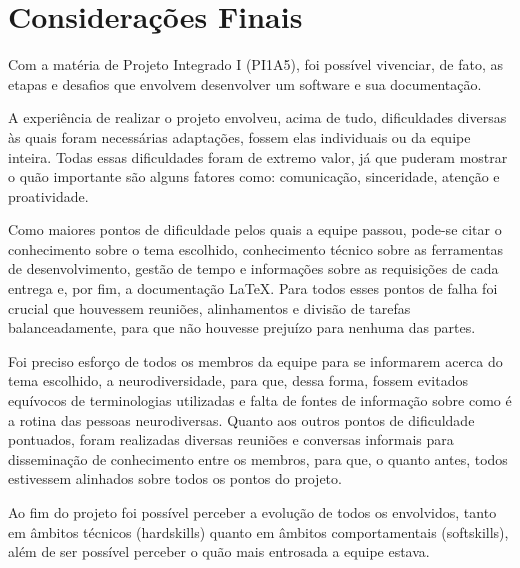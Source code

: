 \chapter{Considerações Finais}
Com a matéria de Projeto Integrado I (PI1A5), foi possível vivenciar, de fato, as etapas e desafios que envolvem desenvolver um software e sua documentação.

A experiência de realizar o projeto envolveu, acima de tudo, dificuldades diversas às quais foram necessárias adaptações, fossem elas individuais ou da equipe inteira. Todas essas dificuldades foram de extremo valor, já que puderam mostrar o quão importante são alguns fatores como: comunicação, sinceridade, atenção e proatividade.

Como maiores pontos de dificuldade pelos quais a equipe passou, pode-se citar o conhecimento sobre o tema escolhido, conhecimento técnico sobre as ferramentas de desenvolvimento, gestão de tempo e informações sobre as requisições de cada entrega e, por fim, a documentação LaTeX. Para todos esses pontos de falha foi crucial que houvessem reuniões, alinhamentos e divisão de tarefas balanceadamente, para que não houvesse prejuízo para nenhuma das partes.

Foi preciso esforço de todos os membros da equipe para se informarem acerca do tema escolhido, a neurodiversidade, para que, dessa forma, fossem evitados equívocos de terminologias utilizadas e falta de fontes de informação sobre como é a rotina das pessoas neurodiversas. Quanto aos outros pontos de dificuldade pontuados, foram realizadas diversas reuniões e conversas informais para disseminação de conhecimento entre os membros, para que, o quanto antes, todos estivessem alinhados sobre todos os pontos do projeto.

Ao fim do projeto foi possível perceber a evolução de todos os envolvidos, tanto em âmbitos técnicos (hardskills) quanto em âmbitos comportamentais (softskills), além de ser possível perceber o quão mais entrosada a equipe estava.

